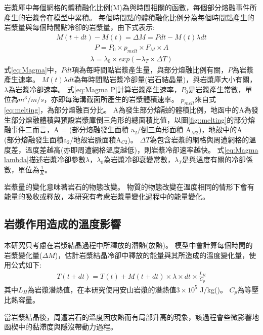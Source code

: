 岩漿庫中每個網格的體積融化比例(M)為與時間相關的函數，每個部分熔融事件所產生的岩漿會在模型中累積。
每個時間點的體積融化比例分為每個時間點產生的岩漿量與每個時間點冷卻的岩漿量，由下式表示:
\begin{align}
    M(t+dt)-M(t) = \Delta M = Pdt-M(t)\lambda dt \label{eq:Magma}
\end{align}
\begin{align}
    P = P_0 \times p_{melt} \times F_M \times A \label{eq:Magma P}
\end{align}
\begin{align}
    \lambda = \lambda_0\times exp(-\lambda_T \times \Delta T) \label{eq:Magma lambda}
\end{align}
式\ref{eq:Magma}中，$Pdt$項為每時間點岩漿產生量，與部分熔融比例有關，$P$為岩漿產生速率。
$M(t)\lambda dt$為每時間點岩漿冷卻量(岩石結晶量)，與岩漿庫大小有關，$\lambda$為岩漿冷卻速率。
式\ref{eq:Magma P}計算岩漿產生速率，$P_0$是岩漿產生常數，單位為$m^3/m/s$，亦即每海溝截面所產生的岩漿體積速率。
$p_{melt}$來自式\ref{eq:melting}，為部分熔融百分比。
A為發生部分熔融的體積比例，地函中的A為發生部分熔融體積與預設岩漿庫倒三角形的總面積比值，以圖\ref{fig::melting}的部分熔融事件二而言，A = (部分熔融發生面積 a$_2$/倒三角形面積 A$_{M2}$)，地殼中的A = (部分熔融發生面積a$_2$/地殼岩脈面積A$_{C2}$)。
$\Delta T$為包含岩漿的網格與周遭網格的溫度差，溫度差越高(亦即周遭網格溫度越低)，則岩漿冷卻速率越快。
式\ref{eq:Magma lambda}描述岩漿冷卻參數$\lambda$，$\lambda_0$為岩漿冷卻衰變常數，$\lambda_T$是與溫度有關的冷卻係數，單位為$\frac{1}{K}$。

岩漿量的變化意味著岩石的物態改變。
物質的物態改變在溫度相同的情形下會有能量的吸收或釋放，本研究有考慮岩漿量變化過程中的能量變化。
\subsection{岩漿作用造成的溫度影響}\label{岩漿作用造成的溫度影響}
本研究只考慮在岩漿結晶過程中所釋放的潛熱(放熱)。
模型中會計算每個時間的岩漿變化量($\Delta M$)，估計岩漿結晶冷卻中釋放的能量與其所造成的溫度變化量，使用公式如下:
\begin{align}
    T(t+dt) = T(t) + M(t+dt)\times \lambda \times dt \times \frac{L_H}{C_p}\label{eq:latent heat}
\end{align}
其中$L_H$為岩漿潛熱值，在本研究使用安山岩漿的潛熱值$3\times 10^5$ J/kg(\citealp{liu2011modeling})。
$C_p$為等壓比熱容量。

當岩漿結晶後，周遭岩石的溫度因放熱而有局部升高的現象，該過程會些微影響地函楔中的黏滯度與隱沒帶動力過程。

